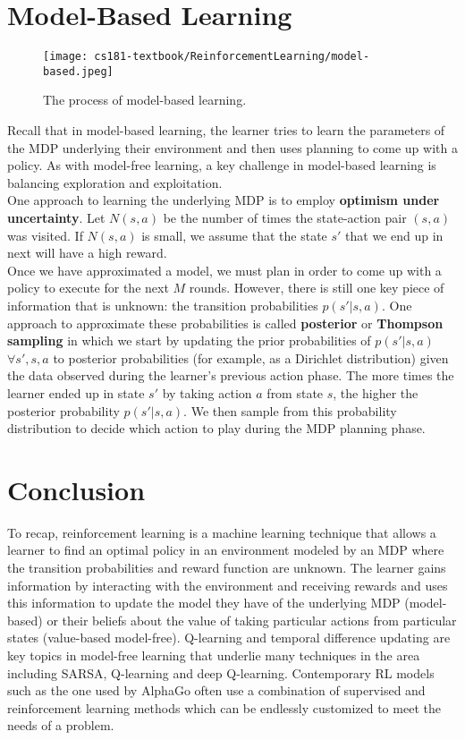 \section{Model-Based Learning}
\begin{figure}[ht!]
    \centering
    \texttt{[image: cs181-textbook/ReinforcementLearning/model-based.jpeg]}
    \caption{The process of model-based learning.}
\end{figure}

Recall that in model-based learning, the learner tries to learn the parameters of the MDP underlying their environment and then uses planning to come up with a policy. As with model-free learning, a key challenge in model-based learning is balancing exploration and exploitation.\\

One approach to learning the underlying MDP is to employ \textbf{optimism under uncertainty}. Let $N(s, a)$ be the number of times the state-action pair $(s, a)$ was visited. If $N(s, a)$ is small, we assume that the state $s'$ that we end up in next will have a high reward.\\

Once we have approximated a model, we must plan in order to come up with a policy to execute for the next $M$ rounds. However, there is still one key piece of information that is unknown: the transition probabilities $p(s'|s, a)$. One approach to approximate these probabilities is called \textbf{posterior} or \textbf{Thompson sampling} in which we start by updating the prior probabilities of $p(s'|s, a)$ $\forall s', s, a$ to posterior probabilities (for example, as a Dirichlet distribution) given the data observed during the learner's previous action phase. The more times the learner ended up in state $s'$ by taking action $a$ from state $s$, the higher the posterior probability $p(s'|s, a)$. We then sample from this probability distribution to decide which action to play during the MDP planning phase.
\section{Conclusion}
To recap, reinforcement learning is a machine learning technique that allows a learner to find an optimal policy in an environment modeled by an MDP where the transition probabilities and reward function are unknown. The learner gains information by interacting with the environment and receiving rewards and uses this information to update the model they have of the underlying MDP (model-based) or their beliefs about the value of taking particular actions from particular states (value-based model-free). Q-learning and temporal difference updating are key topics in model-free learning that underlie many techniques in the area including SARSA, Q-learning and deep Q-learning. Contemporary RL models such as the one used by AlphaGo often use a combination of supervised and reinforcement learning methods which can be endlessly customized to meet the needs of a problem.